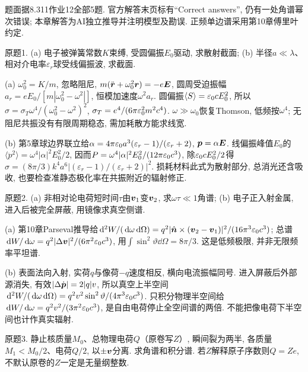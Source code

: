 题面据8.311作业12全部5题. 官方解答末页标有“Correct answers”, 仍有一处角谱幂次错误; 本章解答为AI独立推导并注明模型及勘误. 正频单边谱采用第10章傅里叶约定.
\begin{exercise}
原题1. (a) 电子被弹簧常数$K$束缚, 受圆偏振$E_0$驱动, 求散射截面; (b) 半径$a\ll\lambda$、相对介电率$\varepsilon_r$球受线偏振波, 求截面.
\end{exercise}
\begin{solution}
(a) $\omega_0^2=K/m$, 忽略阻尼, $m(\ddot{\boldsymbol{r}}+\omega_0^2\boldsymbol{r})=-e\boldsymbol{E}$, 圆周受迫振幅$a_r=eE_0/[m|\omega_0^2-\omega^2|]$, 恒模加速度$\omega^2a_r$. 圆偏振$\langle S\rangle=\varepsilon_0 cE_0^2$, 所以$\sigma=\sigma_T\omega^4/(\omega_0^2-\omega^2)^2$, $\sigma_T=e^4/(6\pi\varepsilon_0^2m^2c^4)$. $\omega\gg\omega_0$恢复Thomson, 低频按$\omega^4$; 无阻尼共振没有有限周期稳态, 需加耗散方能求线宽.

(b) 第5章球边界联立给$\alpha=4\pi\varepsilon_0 a^3(\varepsilon_r-1)/(\varepsilon_r+2)$, $\boldsymbol{p}=\alpha\boldsymbol{E}$. 线偏振峰值$E_0$的$\langle\ddot p^2\rangle=\omega^4|\alpha|^2E_0^2/2$, 因而$P=\omega^4|\alpha|^2E_0^2/(12\pi\varepsilon_0 c^3)$, 除$\varepsilon_0 cE_0^2/2$得$\sigma=(8\pi/3)k^4a^6| (\varepsilon_r-1)/(\varepsilon_r+2)|^2$. 损耗材料此式为散射部分, 总消光还含吸收, 也要检查准静态极化率在共振附近的辐射修正.
\end{solution}
\begin{exercise}
原题2. (a) 非相对论电荷短时间$\tau$由$\boldsymbol{v}_1$变$\boldsymbol{v}_2$, 求$\omega\tau\ll1$角谱; (b) 电子正入射金属, 进入后被完全屏蔽, 用镜像求真空侧谱.
\end{exercise}
\begin{solution}
(a) 第10章Parseval推导给$\,\mathrm d^2W/(\,\mathrm d\omega\,\mathrm d\Omega)=q^2|\hat{\boldsymbol{n}}\times(\boldsymbol{v}_2-\boldsymbol{v}_1)|^2/(16\pi^3\varepsilon_0 c^3)$; 总谱$\,\mathrm d W/\,\mathrm d\omega=q^2|\Delta\boldsymbol{v}|^2/(6\pi^2\varepsilon_0 c^3)$, 用$\int\sin^2\vartheta\dd\Omega=8\pi/3$. 这是低频极限, 并非无限频率平坦谱.

(b) 表面法向入射, 实荷$q$与像荷$-q$速度相反, 横向电流振幅同号. 进入屏蔽后外部源消失, 有效$|\Delta\dot{\boldsymbol{p}}|=2|q|v$, 所以真空上半空间$\,\mathrm d^2W/(\,\mathrm d\omega\,\mathrm d\Omega)=q^2v^2\sin^2\vartheta/(4\pi^3\varepsilon_0 c^3)$. 只积分物理半空间给$\,\mathrm d W/\,\mathrm d\omega=q^2v^2/(3\pi^2\varepsilon_0 c^3)$, 是自由电荷停止全空间谱的两倍. 不能把像电荷下半空间也计作真实辐射.
\end{solution}
\begin{exercise}
原题3. 静止核质量$M_0$、总物理电荷$Q$（原卷写$Z$）, 瞬间裂为两半, 各质量$M_1<M_0/2$、电荷$Q/2$, 以$\pm\boldsymbol{v}$分离. 求角谱和积分谱. 若$Z$解释原子序数则$Q=Ze$, 不默认原卷的$Z$一定是无量纲整数.
\end{exercise}
